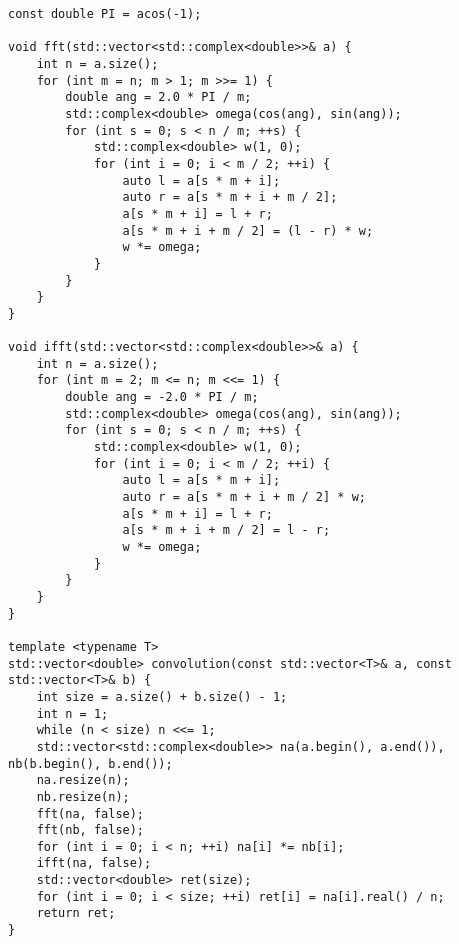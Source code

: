 \begin{lstlisting}
const double PI = acos(-1);

void fft(std::vector<std::complex<double>>& a) {
    int n = a.size();
    for (int m = n; m > 1; m >>= 1) {
        double ang = 2.0 * PI / m;
        std::complex<double> omega(cos(ang), sin(ang));
        for (int s = 0; s < n / m; ++s) {
            std::complex<double> w(1, 0);
            for (int i = 0; i < m / 2; ++i) {
                auto l = a[s * m + i];
                auto r = a[s * m + i + m / 2];
                a[s * m + i] = l + r;
                a[s * m + i + m / 2] = (l - r) * w;
                w *= omega;
            }
        }
    }
}

void ifft(std::vector<std::complex<double>>& a) {
    int n = a.size();
    for (int m = 2; m <= n; m <<= 1) {
        double ang = -2.0 * PI / m;
        std::complex<double> omega(cos(ang), sin(ang));
        for (int s = 0; s < n / m; ++s) {
            std::complex<double> w(1, 0);
            for (int i = 0; i < m / 2; ++i) {
                auto l = a[s * m + i];
                auto r = a[s * m + i + m / 2] * w;
                a[s * m + i] = l + r;
                a[s * m + i + m / 2] = l - r;
                w *= omega;
            }
        }
    }
}

template <typename T>
std::vector<double> convolution(const std::vector<T>& a, const std::vector<T>& b) {
    int size = a.size() + b.size() - 1;
    int n = 1;
    while (n < size) n <<= 1;
    std::vector<std::complex<double>> na(a.begin(), a.end()), nb(b.begin(), b.end());
    na.resize(n);
    nb.resize(n);
    fft(na, false);
    fft(nb, false);
    for (int i = 0; i < n; ++i) na[i] *= nb[i];
    ifft(na, false);
    std::vector<double> ret(size);
    for (int i = 0; i < size; ++i) ret[i] = na[i].real() / n;
    return ret;
}
\end{lstlisting}